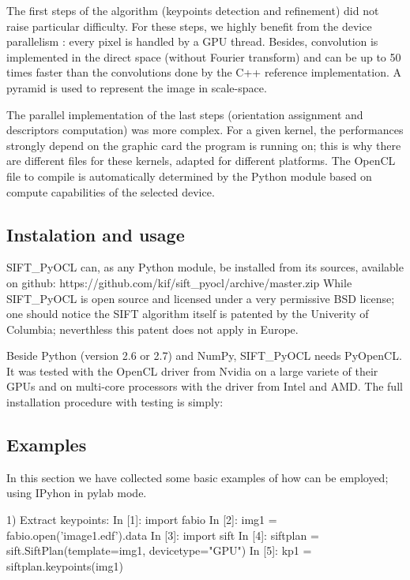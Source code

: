 \documentclass[preprint]{iucr}
\begin{document}
The first steps of the algorithm (keypoints detection and refinement) did not 
raise particular difficulty. 
For these steps, we highly benefit from the device parallelism : every pixel 
is handled by a GPU thread. 
Besides, convolution is implemented in the direct space (without Fourier
transform) and can be up to 50 times faster than the convolutions done by the
C++ reference implementation. 
A pyramid is used to represent the image in scale-space\cite{Lowe04}.

The parallel implementation of the last steps (orientation assignment and 
descriptors computation) was more complex. 
For a given kernel, the performances strongly depend on the graphic card 
the program is running on; this is why there are different files for these
kernels, adapted for different platforms. 
The OpenCL file to compile is automatically determined by the Python module
based on compute capabilities of the selected device.


\subsection{Instalation and usage}
SIFT\_PyOCL can, as any Python module, be installed from its sources,
available on github:
https://github.com/kif/sift_pyocl/archive/master.zip
While SIFT\_PyOCL is open source and licensed under a very
permissive BSD license; one should notice the SIFT algorithm itself is
patented by the Univerity of Columbia\cite{SIFT}; neverthless this patent does
not apply in Europe.

Beside Python (version 2.6 or 2.7) and NumPy, SIFT\_PyOCL needs
PyOpenCL\cite{pyopencl}.
It was tested with the OpenCL\cite{opencl} driver from Nvidia on a
large variete of their GPUs and on multi-core processors with the driver from
Intel and AMD. The full installation procedure with testing is simply:


\subsection{Examples}

In this section we have collected some basic examples of how
 can be employed; using IPyhon\cite{ipython} in
pylab\cite{matplotlib} mode.

1) Extract keypoints:
In [1]: import fabio
In [2]: img1 = fabio.open('image1.edf').data
In [3]: import sift
In [4]: siftplan = sift.SiftPlan(template=img1, devicetype="GPU")
In [5]: kp1 = siftplan.keypoints(img1)
\end{document}
